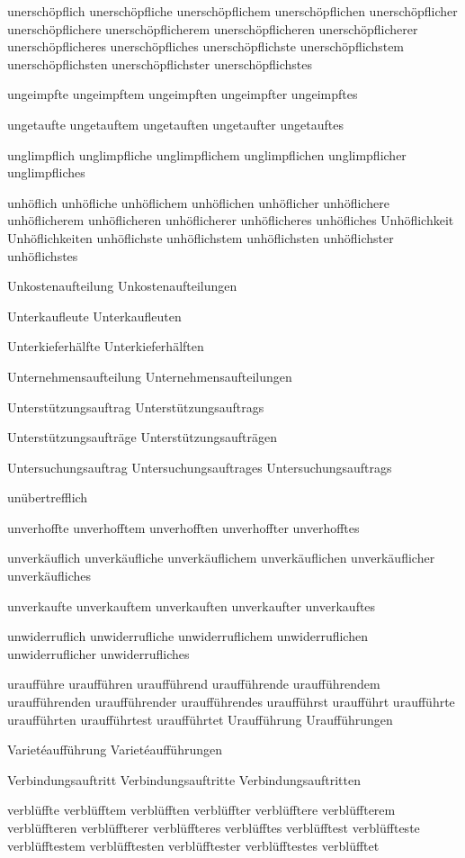 unerschöpflich
unerschöpfliche
unerschöpflichem
unerschöpflichen
unerschöpflicher
unerschöpflichere
unerschöpflicherem
unerschöpflicheren
unerschöpflicherer
unerschöpflicheres
unerschöpfliches
unerschöpflichste
unerschöpflichstem
unerschöpflichsten
unerschöpflichster
unerschöpflichstes

ungeimpfte
ungeimpftem
ungeimpften
ungeimpfter
ungeimpftes

ungetaufte
ungetauftem
ungetauften
ungetaufter
ungetauftes

unglimpflich
unglimpfliche
unglimpflichem
unglimpflichen
unglimpflicher
unglimpfliches

unhöflich
unhöfliche
unhöflichem
unhöflichen
unhöflicher
unhöflichere
unhöflicherem
unhöflicheren
unhöflicherer
unhöflicheres
unhöfliches
Unhöflichkeit
Unhöflichkeiten
unhöflichste
unhöflichstem
unhöflichsten
unhöflichster
unhöflichstes

Unkostenaufteilung
Unkostenaufteilungen

Unterkaufleute
Unterkaufleuten

Unterkieferhälfte
Unterkieferhälften

Unternehmensaufteilung
Unternehmensaufteilungen

Unterstützungsauftrag
Unterstützungsauftrags

Unterstützungsaufträge
Unterstützungsaufträgen

Untersuchungsauftrag
Untersuchungsauftrages
Untersuchungsauftrags

unübertrefflich

unverhoffte
unverhofftem
unverhofften
unverhoffter
unverhofftes

unverkäuflich
unverkäufliche
unverkäuflichem
unverkäuflichen
unverkäuflicher
unverkäufliches

unverkaufte
unverkauftem
unverkauften
unverkaufter
unverkauftes

unwiderruflich
unwiderrufliche
unwiderruflichem
unwiderruflichen
unwiderruflicher
unwiderrufliches

uraufführe
uraufführen
uraufführend
uraufführende
uraufführendem
uraufführenden
uraufführender
uraufführendes
uraufführst
uraufführt
uraufführte
uraufführten
uraufführtest
uraufführtet
Uraufführung
Uraufführungen

Varietéaufführung
Varietéaufführungen

Verbindungsauftritt
Verbindungsauftritte
Verbindungsauftritten

verblüffte
verblüfftem
verblüfften
verblüffter
verblüfftere
verblüffterem
verblüffteren
verblüffterer
verblüffteres
verblüfftes
verblüfftest
verblüffteste
verblüfftestem
verblüfftesten
verblüfftester
verblüfftestes
verblüfftet

